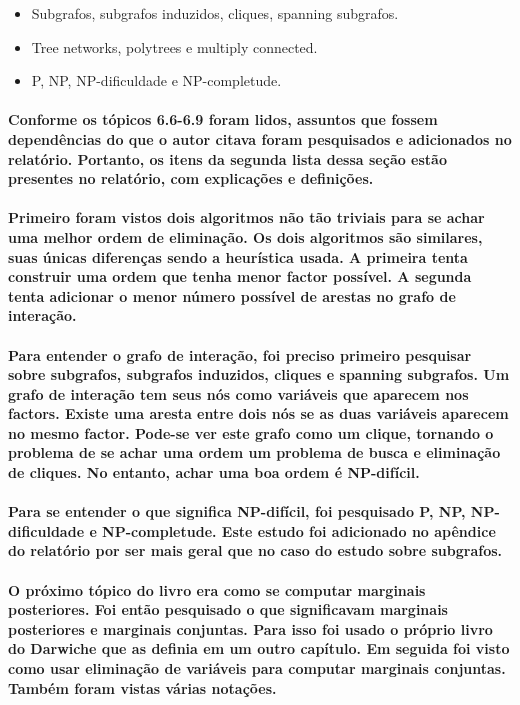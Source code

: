 \documentclass[a4paper,10pt]{article}
\theoremstyle{plain}
\begin{document}
\begin{itemize}
  \item Subgrafos, subgrafos induzidos, cliques, spanning subgrafos.
  \item Tree networks, polytrees e multiply connected.
  \item P, NP, NP-dificuldade e NP-completude.
\end{itemize}

\paragraph{
  Conforme os tópicos 6.6-6.9 foram lidos, assuntos que fossem dependências do que o autor citava
  foram pesquisados e adicionados no relatório. Portanto, os itens da segunda lista dessa seção
  estão presentes no relatório, com explicações e definições.
}

\paragraph{
  Primeiro foram vistos dois algoritmos não tão triviais para se achar uma melhor ordem de
  eliminação. Os dois algoritmos são similares, suas únicas diferenças sendo a heurística usada.
  A primeira tenta construir uma ordem que tenha menor factor possível. A segunda tenta adicionar
  o menor número possível de arestas no grafo de interação.
}

\paragraph{
  Para entender o grafo de interação, foi preciso primeiro pesquisar sobre subgrafos, subgrafos
  induzidos, cliques e spanning subgrafos. Um grafo de interação tem seus nós como variáveis que
  aparecem nos factors. Existe uma aresta entre dois nós se as duas variáveis aparecem no mesmo
  factor. Pode-se ver este grafo como um clique, tornando o problema de se achar uma ordem um
  problema de busca e eliminação de cliques. No entanto, achar uma boa ordem é NP-difícil.
}

\paragraph{
  Para se entender o que significa NP-difícil, foi pesquisado P, NP, NP-dificuldade e
  NP-completude. Este estudo foi adicionado no apêndice do relatório por ser mais geral que no caso
  do estudo sobre subgrafos.
}

\paragraph{
  O próximo tópico do livro era como se computar marginais posteriores. Foi então pesquisado o que
  significavam marginais posteriores e marginais conjuntas. Para isso foi usado o próprio livro do
  Darwiche\cite{bayes-net-darwiche} que as definia em um outro capítulo. Em seguida foi visto como
  usar eliminação de variáveis para computar marginais conjuntas. Também foram vistas várias notações.
}
\end{document}
